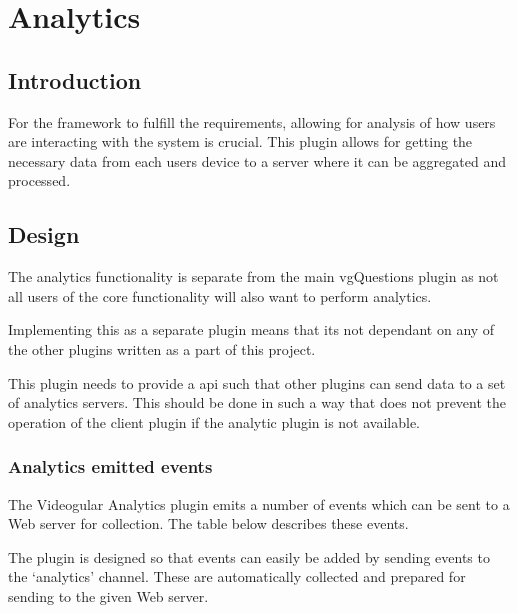 
\chapter{Analytics} \label{Chapter: Analytics}


\section{Introduction}

For the framework to fulfill the requirements, allowing for analysis of how users are interacting with the system is crucial. This plugin allows for getting the necessary data from each users device to a server where it can be aggregated and processed.

\section{Design}

The analytics functionality is separate from the main vgQuestions plugin as not all users of the core functionality will also want to perform analytics.

Implementing this as a separate plugin means that its not dependant on any of the other plugins written as a part of this project.

This plugin needs to provide a api such that other plugins can send data to a set of analytics servers. This should be done in such a way that does not prevent the operation of the client plugin if the analytic plugin is not available.

\subsection{Analytics emitted events}

The Videogular Analytics plugin emits a number of events which can be sent to a Web server for collection. The table below describes these events.

The plugin is designed so that events can easily be added by sending events to the `analytics' channel. These are automatically collected and prepared for sending to the given Web server.

